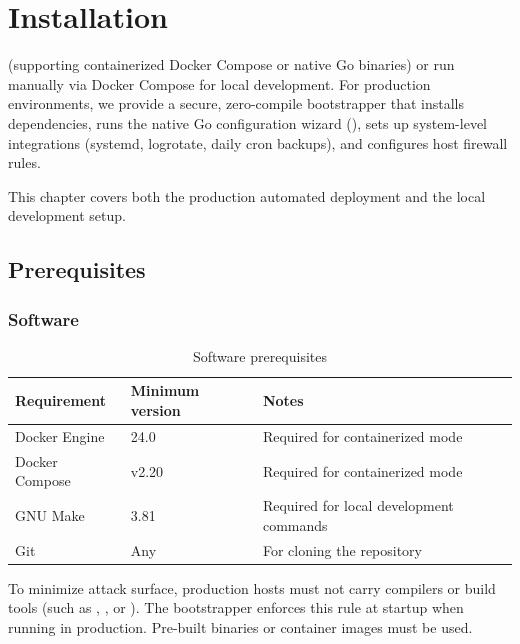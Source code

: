 
\chapter{Installation}
\label{ch:installation}
 (supporting containerized Docker Compose or native Go binaries) or run manually via Docker Compose for local development. For production environments, we provide a secure, zero-compile bootstrapper that installs dependencies, runs the native Go configuration wizard (), sets up system-level integrations (systemd, logrotate, daily cron backups), and configures host firewall rules.

This chapter covers both the production automated deployment and the local development setup.

\section{Prerequisites}

\subsection{Software}

\begin{table}[ht]
  \small
  \begin{tabularx}{\linewidth}{lll}
    \toprule
    \textbf{Requirement} & \textbf{Minimum version} & \textbf{Notes} \\
    \midrule
    Docker Engine & 24.0 & Required for containerized mode \\
    Docker Compose & v2.20 & Required for containerized mode \\
    GNU Make & 3.81 & Required for local development commands \\
    Git & Any & For cloning the repository \\
    \bottomrule
  \end{tabularx}
  \caption{Software prerequisites}
\end{table}

\begin{warningbox}
To minimize attack surface, production hosts must not carry compilers or build tools (such as , , or ). The bootstrapper enforces this rule at startup when running in production. Pre-built binaries or container images must be used.
\end{warningbox}

